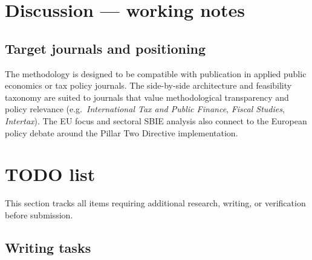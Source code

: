 \documentclass[11pt,a4paper]{article}
\begin{document}
\section{Discussion --- working notes}\label{w:discussion}

\subsection{Target journals and positioning}

The methodology is designed to be compatible with publication in applied public economics or tax policy journals. The side-by-side architecture and feasibility taxonomy are suited to journals that value methodological transparency and policy relevance (e.g.\ \emph{International Tax and Public Finance}, \emph{Fiscal Studies}, \emph{Intertax}). The EU focus and sectoral SBIE analysis also connect to the European policy debate around the Pillar Two Directive implementation.

\section{TODO list}\label{w:todos}

This section tracks all items requiring additional research, writing, or verification before submission.

\subsection{Writing tasks}
\end{document}
